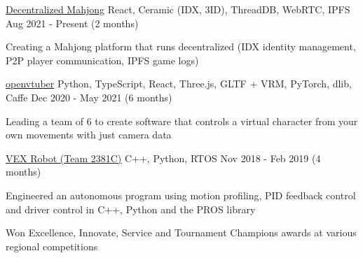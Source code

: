 \begin{cventries}
	\cventry
	{\href{https://github.com/fensandemajiang/fensandemajiang}{Decentralized Mahjong}}
	{React, Ceramic (IDX, 3ID), ThreadDB, WebRTC, IPFS}
	{}
	{Aug 2021 - Present  (2 months)}
	{
		\begin{cvitems}
			\item{Creating a Mahjong platform that runs decentralized (IDX identity management, P2P player communication, IPFS game logs)}
		\end{cvitems}
	}
	\cventry
	{\href{https://github.com/virtuber/openvtuber}{openvtuber}}
	{Python, TypeScript, React, Three.js, GLTF + VRM, PyTorch, dlib, Caffe}
	{}
	{Dec 2020 - May 2021 (6 months)}
	{
		\begin{cvitems}
			\item{Leading a team of 6 to create software that controls a virtual character from your own movements with just camera data}
		\end{cvitems}
	}
	\cventry
	{\href{https://gitlab.com/2381-robotics/2381C-V2}{VEX Robot (Team 2381C)}}
	{C++, Python, RTOS}
	{}
	{Nov 2018 - Feb 2019 (4 months)}
	{
		\begin{cvitems}
			\item{Engineered an autonomous program using motion profiling, PID feedback control and driver control in C++, Python and the PROS library}
			\item{Won Excellence, Innovate, Service and Tournament Champions awards at various regional competitions}
		\end{cvitems}
	}
\end{cventries}
